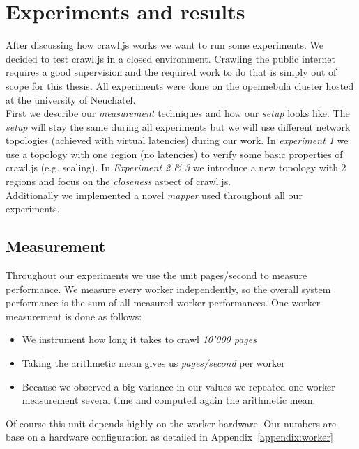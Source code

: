 
\chapter{Experiments and results} %

\label{Chapter5} %


After discussing how crawl.js works we want to run some experiments. We decided to test crawl.js in a closed environment. Crawling the public internet requires a good supervision and the required work to do that is simply out of scope for this thesis. All experiments were done on the opennebula cluster hosted at the university of Neuchatel.
\\
First we describe our \emph{measurement} techniques and how our \emph{setup} looks like. The \emph{setup} will stay the same during all experiments but we will use different network topologies (achieved with virtual latencies) during our work. In \emph{experiment 1} we use a topology with one region (no latencies) to verify some basic properties of crawl.js (e.g. scaling). In \emph{Experiment 2 \& 3} we introduce a new topology with 2 regions and focus on the \emph{closeness} aspect of crawl.js.
\\
Additionally we implemented a novel \emph{mapper} used throughout all our experiments.

\section{Measurement}
Throughout our experiments we use the unit pages/second to measure performance. We measure every worker independently, so the overall system performance is the sum of all measured worker performances. One worker measurement is done as follows:
\begin{itemize}
  \item We instrument how long it takes to crawl \emph{10'000 pages}
  \item Taking the arithmetic mean gives us \emph{pages/second} per worker
  \item Because we observed a big variance in our values we repeated one worker measurement several time and computed again the arithmetic mean.
\end{itemize}
Of course this unit depends highly on the worker hardware. Our numbers are base on a hardware configuration as detailed in Appendix~\ref{appendix:worker}

